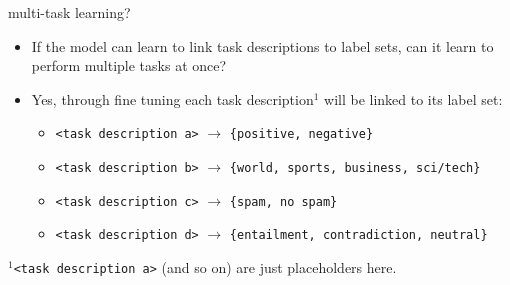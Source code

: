 \documentclass[11pt,compress,t,notes=noshow, xcolor=table]{beamer}
\begin{document}

\begin{frame}{multi-task learning?}

\vfill

\begin{itemize}
	\item \ques If the model can learn to link task descriptions to label sets, can it learn to perform multiple tasks at once?
	\item Yes, through fine tuning each task description$^1$ will be linked to its label set:
			\begin{itemize}
				\item \texttt{<task description a>} $\to$ \texttt{\{positive, negative\}}
				\item \texttt{<task description b>} $\to$ \texttt{\{world, sports, business, sci/tech\}} 
				\item \texttt{<task description c>} $\to$ \texttt{\{spam, no spam\}}
				\item \texttt{<task description d>} $\to$ \texttt{\{entailment, contradiction, neutral\}}
			\end{itemize}
\end{itemize}

\vfill

$^1$\footnotesize{\texttt{<task description a>} (and so on) are just placeholders here.}
\end{frame}

\end{document}
